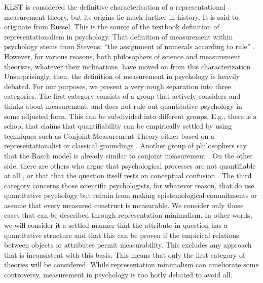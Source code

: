 \documentclass[utf8]{FrontiersinVancouver}
\begin{document}
KLST is considered the definitive characterisation of a representational measurement theory, but its origins lie much further in history. It is said to originate from Russel. This is the source of the textbook definition of representationalism in psychology. That definition of measurement within psychology stems from Stevens: ``the assignment of numerals according to rule'' \citep{stevensMathematicsMeasurementPsychophysics1951}. However, for various reasons, both philosophers of science and measurement theorists, whatever their inclinations, have moved on from this characterization \citep{michellMeasurementPsychologyCritical1999}. Unsurprisingly, then, the definition of measurement in psychology is heavily debated. For our purposes, we present a very rough separation into three categories. The first category consists of a group that actively considers and thinks about measurement, and does not rule out quantitative psychology in some adjusted form. This can be subdivided into different groups. E.g., there is a school that claims that quantifiability can be empirically settled by using techniques such as Conjoint Measurement Theory either based on a representationalist or classical groundings \citep{luceSimultaneousConjointMeasurement1964,krantzFoundationsMeasurement1971, michellMeasurementPsychologyCritical1999}. Another group of philosophers say that the Rasch model is already similar to conjoint measurement \citep{borsboomWhyPsychometricsNot2004}. On the other side, there are others who argue that psychological processes are not quantifiable at all \citep{trendlerConjointMeasurementUndone2019}, or that that the question itself rests on conceptual confusion \citep{franzArePsychologicalAttributes2022,tafreshiSenseNonsensePsychological2022}. The third category concerns those scientific psychologists, for whatever reason, that do use quantitative psychology but refrain from making epistemological commitments or assume that every measured construct is measurable. We consider only those cases that can be described through representation minimalism. In other words, we will consider it a settled manner that the attribute in question has a quantitative structure and that this can be proven if the empirical relations between objects or attributes permit measurability. This excludes any approach that is inconsistent with this basis. This means that only the first category of theories will be considered. While representation minimalism can ameliorate some controversy, measurement in psychology is too hotly debated to avoid all.
\end{document}

